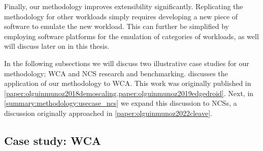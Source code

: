 Finally, our methodology improves extensibility significantly.
Replicating the methodology for other workloads simply requires developing a new piece of software to emulate the new workload.
This can further be simplified by employing software platforms for the emulation of categories of workloads, as well will discuss later on in this thesis.

\medskip
In the following subsections we will discuss two illustrative case studies for our methodology; \acl{WCA} and \acl{NCS} research and benchmarking.
 discusses the application of our methodology to \gls{WCA}.
This work was originally published in \cref{paper:olguinmunoz2018demoscaling,paper:olguinmunoz2019edgedroid}.
Next, in \cref{summary:methodology:usecase_ncs} we expand this discussion to \glspl{NCS}, a discussion originally approached in \cref{paper:olguinmunoz2022cleave}.

\subsection{Case study: \acl{WCA}}\label{summary:methodology:usecase_wca}

